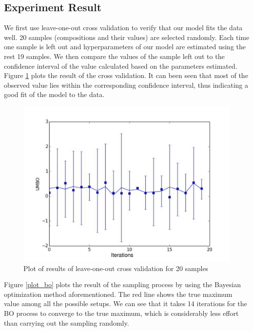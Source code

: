 \documentclass[11pt]{article}
\begin{document}
\subsection{Experiment Result}
We first use leave-one-out cross validation to verify that our model fits the data well. 20 samples (compositions and their values) are selected randomly. Each time one sample is left out and hyperparameters of our model are estimated using the rest 19 samples. We then compare the values of the sample left out to the confidence interval of the value calculated based on the parameters estimated. Figure \ref{loo} plots the result of the cross validation. It can been seen that most of the observed value lies within the corresponding confidence interval, thus indicating a good fit of the model to the data.
\begin{center}
\begin{figure}
\includegraphics[scale=.8]{plot_loocv.pdf}
\caption{Plot of results of leave-one-out cross validation for 20 samples}
\label{loo}
\end{figure}
\end{center}
Figure \ref{plot_bo} plots the result of the sampling process by using the Bayesian optimization method aforementioned. The red line shows the true maximum value among all the possible setups. We can see that it takes 14 iterations for the BO process to converge to the true maximum, which is considerably less effort than carrying out the sampling randomly.
\end{document}
